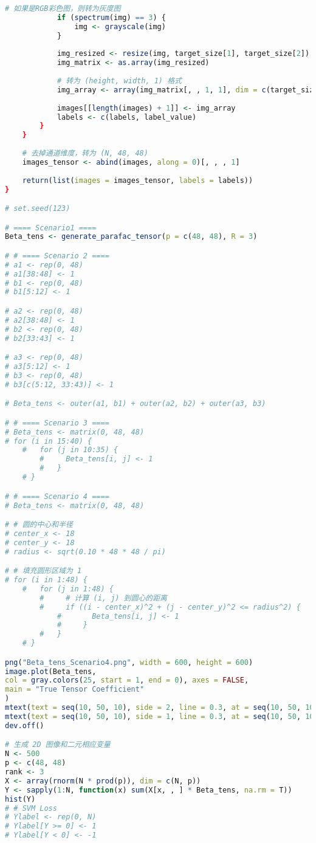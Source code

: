 \documentclass[AutoFakeBold]{LZUThesis}
\begin{document}
\begin{lstlisting}[language=R, caption = {BT-SVM}算法]
			# 如果是RGB彩色图，则转为灰度图
			if (spectrum(img) == 3) {
				img <- grayscale(img)
			}
			
			img_resized <- resize(img, target_size[1], target_size[2])
			img_matrix <- as.array(img_resized)
			
			# 转为 (height, width, 1) 格式
			img_array <- array(img_matrix[, , 1, 1], dim = c(target_size[2], target_size[1], 1))
			
			images[[length(images) + 1]] <- img_array
			labels <- c(labels, label_value)
		}
	}
	
	# 去掉通道维度，转为 (N, 48, 48)
	images_tensor <- abind(images, along = 0)[, , , 1]
	
	return(list(images = images_tensor, labels = labels))
}

# set.seed(123)

# ==== Scenario1 ====
Beta_tens <- generate_parafac_tensor(p = c(48, 48), R = 3)

# # ==== Scenario 2 ====
# a1 <- rep(0, 48)
# a1[38:48] <- 1
# b1 <- rep(0, 48)
# b1[5:12] <- 1

# a2 <- rep(0, 48)
# a2[38:48] <- 1
# b2 <- rep(0, 48)
# b2[33:43] <- 1

# a3 <- rep(0, 48)
# a3[5:12] <- 1
# b3 <- rep(0, 48)
# b3[c(5:12, 33:43)] <- 1

# Beta_tens <- outer(a1, b1) + outer(a2, b2) + outer(a3, b3)

# # ==== Scenario 3 ====
# Beta_tens <- matrix(0, 48, 48)
# for (i in 15:40) {
	#   for (j in 10:35) {
		#     Beta_tens[i, j] <- 1
		#   }
	# }

# # ==== Scenario 4 ====
# Beta_tens <- matrix(0, 48, 48)

# # 圆的中心和半径
# center_x <- 18
# center_y <- 18
# radius <- sqrt(0.10 * 48 * 48 / pi)

# # 填充圆形区域为 1
# for (i in 1:48) {
	#   for (j in 1:48) {
		#     # 计算 (i, j) 到圆心的距离
		#     if ((i - center_x)^2 + (j - center_y)^2 <= radius^2) {
			#       Beta_tens[i, j] <- 1
			#     }
		#   }
	# }

png("Beta_tens_Scenario4.png", width = 600, height = 600)
image.plot(Beta_tens,
col = gray.colors(25, start = 1, end = 0), axes = FALSE,
main = "True Tensor Coefficient"
)
mtext(text = seq(10, 50, 10), side = 2, line = 0.3, at = seq(10, 50, 10) / 48, las = 1, cex = 0.8)
mtext(text = seq(10, 50, 10), side = 1, line = 0.3, at = seq(10, 50, 10) / 48, las = 2, cex = 0.8)
dev.off()

# 生成 2D 图像和二元相应变量
N <- 500
p <- c(48, 48)
rank <- 3
X <- array(rnorm(N * prod(p)), dim = c(N, p))
Y <- sapply(1:N, function(x) sum(X[x, , ] * Beta_tens, na.rm = T))
hist(Y)
# # SVM Loss
# Ylabel <- rep(0, N)
# Ylabel[Y >= 0] <- 1
# Ylabel[Y < 0] <- -1


\end{lstlisting}
\end{document}
